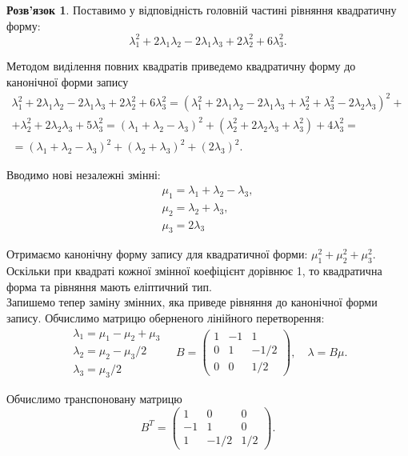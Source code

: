 \documentclass[a4paper, 12pt]{article}
\theoremstyle{definition}
\newtheorem*{solution*}{Розв'язок}
\begin{document}
\begin{solution*}
	Поставимо у відповідність головній частині рівняння квадратичну форму: \[\lambda_1^2+2\lambda_1\lambda_2-2\lambda_1\lambda_3+2\lambda_2^2+6\lambda_3^2. \]

	Методом виділення повних квадратів приведемо квадратичну форму до канонічної форми запису
	\begin{multline*}
		\lambda_1^2+2\lambda_1\lambda_2-2\lambda_1\lambda_3+2\lambda_2^2+6\lambda_3^2 = (\lambda_1^2+2\lambda_1\lambda_2-2\lambda_1\lambda_3+\lambda_2^2+\lambda_3^2 - 2 \lambda_2\lambda_3)^2 + \\ 
		+ \lambda_2^2 + 2\lambda_2\lambda_3 + 5\lambda_3^2 = (\lambda_1+\lambda_2-\lambda_3)^2 + (\lambda_2^2 + 2\lambda_2\lambda_3+\lambda_3^2) + 4\lambda_3^2 = \\
		= (\lambda_1+\lambda_2-\lambda_3)^2 + (\lambda_2 + \lambda_3)^2 + (2\lambda_3)^2.
	\end{multline*}

	Вводимо нові незалежні змінні: \[ \begin{matrix} \mu_1 = \lambda_1 + \lambda_2 - \lambda_3, \\ \mu_2 = \lambda_2 + \lambda_3, \\ \mu_3 = 2 \lambda_3 \end{matrix} \]

	Отримаємо канонічну форму запису для квадратичної форми: $\mu_1^2 + \mu_2^2 + \mu_3^2$. \\

	Оскільки при квадраті кожної змінної коефіцієнт дорівнює 1, то квадратична форма та рівняння мають еліптичний тип. \\

	Запишемо тепер заміну змінних, яка приведе рівняння до канонічної форми запису. Обчислимо матрицю оберненого лінійного перетворення:
	\[ \begin{matrix} \lambda_1 = \mu_1 - \mu_2 + \mu_3 \\ \lambda_2 = \mu_2 - \mu_3/2 \\ \lambda_3 = \mu_3 / 2 \end{matrix} \quad B = \begin{pmatrix} 1 & -1 & 1 \\ 0 & 1 & -1/2 \\ 0 & 0 & 1/2 \end{pmatrix}, \quad \lambda = B \mu. \]

	Обчислимо транспоновану матрицю \[ B^T = \begin{pmatrix} 1 & 0 & 0 \\ -1 & 1 & 0 \\ 1 & -1/2 & 1/2 \end{pmatrix}. \]


\end{solution*}
\end{document}
